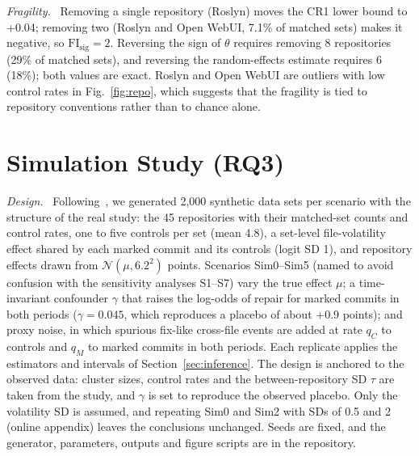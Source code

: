 \documentclass[runningheads]{llncs}
\newcommand{\runin}[1]{\par\textit{#1}\ }
\begin{document}
\runin{Fragility.} Removing a single repository (Roslyn) moves the CR1 lower bound to +0.04; removing two (Roslyn and Open WebUI, 7.1\% of matched sets) makes it negative, so $\mathrm{FI}_{\mathrm{sig}} = 2$. Reversing the sign of $\theta$ requires removing 8 repositories (29\% of matched sets), and reversing the random-effects estimate requires 6 (18\%); both values are exact. Roslyn and Open WebUI are outliers with low control rates in Fig.~\ref{fig:repo}, which suggests that the fragility is tied to repository conventions rather than to chance alone.

\section{Simulation Study (RQ3)}\label{sec:sim}

\runin{Design.} Following~\cite{morris2019}, we generated 2,000 synthetic data sets per scenario with the structure of the real study: the 45 repositories with their matched-set counts and control rates, one to five controls per set (mean 4.8), a set-level file-volatility effect shared by each marked commit and its controls (logit SD 1), and repository effects drawn from $\mathcal{N}(\mu, 6.2^2)$ points. Scenarios Sim0--Sim5 (named to avoid confusion with the sensitivity analyses S1--S7) vary the true effect $\mu$; a time-invariant confounder $\gamma$ that raises the log-odds of repair for marked commits in both periods ($\gamma = 0.045$, which reproduces a placebo of about +0.9 points); and proxy noise, in which spurious fix-like cross-file events are added at rate $q_C$ to controls and $q_M$ to marked commits in both periods. Each replicate applies the estimators and intervals of Section~\ref{sec:inference}. The design is anchored to the observed data: cluster sizes, control rates and the between-repository SD $\tau$ are taken from the study, and $\gamma$ is set to reproduce the observed placebo. Only the volatility SD is assumed, and repeating Sim0 and Sim2 with SDs of 0.5 and 2 (online appendix) leaves the conclusions unchanged. Seeds are fixed, and the generator, parameters, outputs and figure scripts are in the repository.
\end{document}
